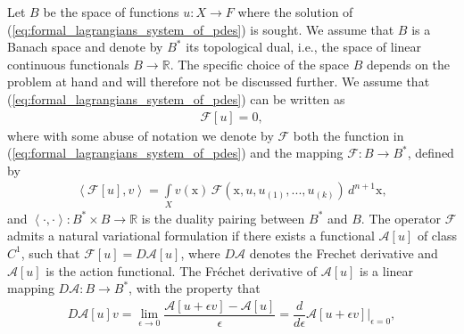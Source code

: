 \documentclass[12pt,a4paper,reqno]{article}
\begin{document}
Let $B$ be the space of functions ${\ensuremath{{\ensuremath{{u}}}}} : X \rightarrow F$ where the solution of (\ref{eq:formal_lagrangians_system_of_pdes}) is sought.
We assume that $B$ is a Banach space and denote by $B^{*}$ its topological dual, i.e., the space of linear continuous functionals $B \rightarrow \mathbb{R}$.
The specific choice of the space $B$ depends on the problem at hand and will therefore not be discussed further.
We assume that (\ref{eq:formal_lagrangians_system_of_pdes}) can be written as
\begin{align}\label{eq:formal_lagrangians_system_of_pdes_operator}
\mathcal{F} [{\ensuremath{{\ensuremath{{u}}}}}] = 0 ,
\end{align}
where with some abuse of notation we denote by $\mathcal{F}$ both the function in (\ref{eq:formal_lagrangians_system_of_pdes}) and the mapping $\mathcal{F} : B \rightarrow B^{*}$, defined by
\begin{align}\label{eq:formal_lagrangians_duality_pairing}
{\ensuremath{\left < { \mathcal{F} [{\ensuremath{{\ensuremath{{u}}}}}] , {\ensuremath{{\ensuremath{{v}}}}} } \right >}} = \int \limits_{X} {\ensuremath{{\ensuremath{{v}}}}} ({\ensuremath{{\ensuremath{\mathrm{{x}}}}}}) \, \mathcal{F} ({\ensuremath{{\ensuremath{\mathrm{{x}}}}}}, {\ensuremath{{\ensuremath{{u}}}}}, {\ensuremath{{\ensuremath{{u}}}}}_{(1)}, ..., {\ensuremath{{\ensuremath{{u}}}}}_{(k)}) \, d^{n+1} {\ensuremath{{\ensuremath{\mathrm{{x}}}}}} ,
\end{align}
and ${\ensuremath{\left < { \cdot , \cdot } \right >}} : B^{*} \times B \rightarrow \mathbb{R}$ is the duality pairing between $B^{*}$ and $B$.
The operator $\mathcal{F}$ admits a natural variational formulation if there exists a functional $\mathcal{A} [u]$ of class $C^{1}$, such that $\mathcal{F} [u] = {\ensuremath{D}} \mathcal{A} [u]$, where ${\ensuremath{D}} \mathcal{A}$ denotes the Frechet derivative and $\mathcal{A} [u]$ is the action functional.
The Fr\'{e}chet derivative of $\mathcal{A} [u]$ is a linear mapping ${\ensuremath{D}} \mathcal{A} : B \rightarrow B^{*}$, with the property that
\begin{align}\label{eq:formal_lagrangians_frechet_derivative}
{\ensuremath{D}} \mathcal{A} [{\ensuremath{{\ensuremath{{u}}}}}] {\ensuremath{{\ensuremath{{v}}}}}
= \lim \limits_{{\ensuremath{\epsilon}} \rightarrow 0} \dfrac{\mathcal{A} [{\ensuremath{{\ensuremath{{u}}}}} + {\ensuremath{\epsilon}} {\ensuremath{{\ensuremath{{v}}}}}] - \mathcal{A} [{\ensuremath{{\ensuremath{{u}}}}}]}{\ensuremath{\epsilon}}
= \dfrac{d}{d{\ensuremath{\epsilon}}} \mathcal{A} [{\ensuremath{{\ensuremath{{u}}}}} + {\ensuremath{\epsilon}} {\ensuremath{{\ensuremath{{v}}}}}] \bigg\vert_{{\ensuremath{\epsilon}}=0} ,
\end{align}
\end{document}
